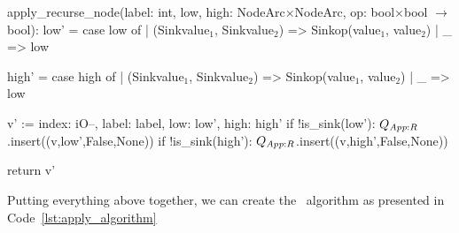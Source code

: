 \begin{lstfloat}[ht!]
  \centering

  \begin{blstlisting}
  apply_recurse_node(label: int,
                     low, high: NodeArc$\times$NodeArc,
                     op: bool$\times$bool $\rightarrow$ bool):
        low' = case low of
               | (Sink{value$_1$}, Sink{value$_2$}) => Sink{op(value$_1$, value$_2$)}
               | _ => low

        high' = case high of
                | (Sink{value$_1$}, Sink{value$_2$}) => Sink{op(value$_1$, value$_2$)}
                | _ => low

         v' := { index: iO--, label: label, low: low', high: high' }
         if !is_sink(low'): $\ApplyQrec$.insert((v,low',False,None))
         if !is_sink(high'): $\ApplyQrec$.insert((v,high',False,None))

         return v'
  \end{blstlisting}

  \caption{Construction of to-be-outputted node \lstinline{v'} and recursing
    using \ApplyQrec.}
  \label{lst:apply_recurse_node}
\end{lstfloat}

Putting everything above together, we can create the \Apply\ algorithm as
presented in Code~\ref{lst:apply_algorithm}

